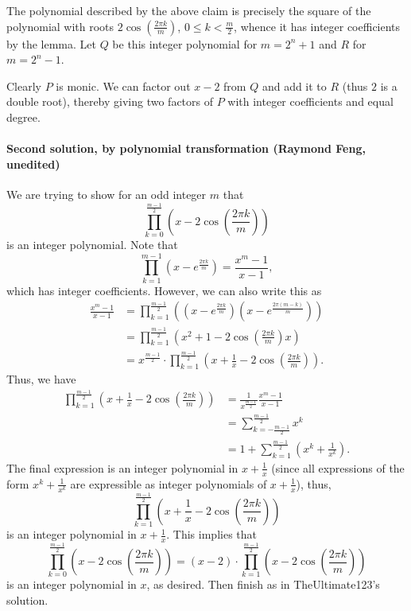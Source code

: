 The polynomial described by the above claim is precisely the square of the polynomial with roots $2\cos(\frac{2\pi k}m)$, $0\le k<\frac m2$, whence it has integer coefficients by the lemma. Let $Q$ be this integer polynomial for $m=2^n+1$ and $R$ for $m=2^n-1$.

Clearly $P$ is monic. We can factor out $x-2$ from $Q$ and add it to $R$ (thus $2$ is a double root), thereby giving two factors of $P$ with integer coefficients and equal degree.

\paragraph{Second solution, by polynomial transformation (Raymond Feng, unedited)}     We are trying to show for an odd integer $m$ that\[\prod_{k=0}^{\frac{m-1}2} \left(x-2\cos\left(\frac{2\pi k}{m}\right)\right)\]is an integer polynomial. Note that\[\prod_{k=1}^{m-1} \left(x-e^{\frac{2\pi k}{m}}\right) = \frac{x^m-1}{x-1},\]which has integer coefficients. However, we can also write this as
\begin{align*}
    \frac{x^m-1}{x-1}&=\prod_{k=1}^{\frac{m-1}2} \left(\left(x-e^{\frac{2\pi k}{m}}\right)\left(x-e^{\frac{2\pi (m-k)}{m}}\right)\right)\\
    &= \prod_{k=1}^{\frac{m-1}2} \left(x^2+1-2\cos\left(\frac{2\pi k}{m}\right)x\right)\\
    &= x^{\frac{m-1}2}\cdot \prod_{k=1}^{\frac{m-1}2} \left(x+\frac1x-2\cos\left(\frac{2\pi k}{m}\right)\right).
\end{align*}
Thus, we have
\begin{align*}
    \prod_{k=1}^{\frac{m-1}2} \left(x+\frac1x-2\cos\left(\frac{2\pi k}{m}\right)\right) &= \frac1{x^{\frac{m-1}2}} \frac{x^m-1}{x-1}\\
    &= \sum_{k=-\frac{m-1}2}^{\frac{m-1}2}x^k\\
    &= 1+\sum_{k=1}^{\frac{m-1}2} \left(x^k+\frac1{x^k}\right).
\end{align*}
The final expression is an integer polynomial in $x+\frac1x$ (since all expressions of the form $x^k+\frac1{x^k}$ are expressible as integer polynomials of $x+\frac1x$), thus,\[\prod_{k=1}^{\frac{m-1}2} \left(x+\frac1x-2\cos\left(\frac{2\pi k}{m}\right)\right)\]is an integer polynomial in $x+\frac1x$. This implies that\[\prod_{k=0}^{\frac{m-1}2} \left(x-2\cos\left(\frac{2\pi k}{m}\right)\right) = (x-2)\cdot \prod_{k=1}^{\frac{m-1}2} \left(x-2\cos\left(\frac{2\pi k}{m}\right)\right)\]is an integer polynomial in $x$, as desired. Then finish as in TheUltimate123's solution.

